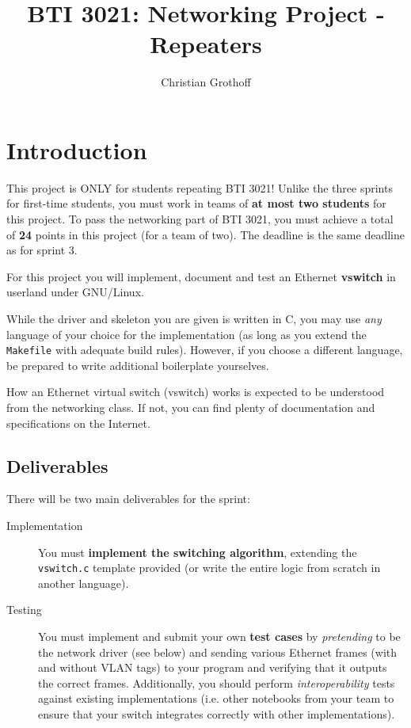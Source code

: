 \documentclass{article}
\title{BTI 3021: Networking Project - Repeaters}
\author{Christian Grothoff}
\date{}
\begin{document}
\maketitle

\section{Introduction}

This project is ONLY for students repeating BTI 3021!  Unlike the
three sprints for first-time students, you must work in teams of {\bf
  at most two students} for this project.  To pass the networking part
of BTI 3021, you must achieve a total of {\bf 24} points in this
project (for a team of two).  The deadline is the same deadline as for
sprint 3.

For this project you will implement, document and test an Ethernet
{\bf vswitch} in userland under GNU/Linux.

While the driver and skeleton you are given is written in C, you may
use {\em any} language of your choice for the implementation (as long
as you extend the {\tt Makefile} with adequate build rules).  However,
if you choose a different language, be prepared to write additional
boilerplate yourselves.

How an Ethernet virtual switch (vswitch) works is expected to be
understood from the networking class. If not, you can find plenty of
documentation and specifications on the Internet.


\subsection{Deliverables}

There will be two main deliverables for the sprint:

\begin{description}
\item[Implementation] You must {\bf implement the switching
  algorithm}, extending the {\tt vswitch.c} template provided
  (or write the entire logic from scratch in another language).
\item[Testing] You must implement and submit your own {\bf test cases}
  by {\em pretending} to be the network driver (see below) and sending
  various Ethernet frames (with and without VLAN tags)
  to your program and verifying that it
  outputs the correct frames. Additionally, you should perform
  {\em interoperability} tests against existing
  implementations (i.e. other notebooks from your team to ensure that
  your switch integrates correctly with other implementations).
\end{description}
\end{document}
